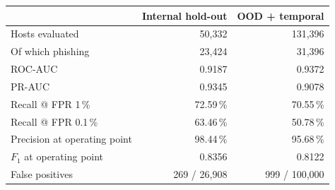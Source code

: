\begin{tabular}{lrr}
\toprule
& Internal hold-out & OOD + temporal \\
\midrule
Hosts evaluated & 50{,}332 & 131{,}396 \\
Of which phishing & 23{,}424 & 31{,}396 \\
ROC-AUC & 0.9187 & 0.9372 \\
PR-AUC & 0.9345 & 0.9078 \\
Recall @ FPR 1\,\% & 72.59\,\% & 70.55\,\% \\
Recall @ FPR 0.1\,\% & 63.46\,\% & 50.78\,\% \\
Precision at operating point & 98.44\,\% & 95.68\,\% \\
$F_1$ at operating point & 0.8356 & 0.8122 \\
False positives & 269 / 26{,}908 & 999 / 100{,}000 \\
\bottomrule
\end{tabular}
